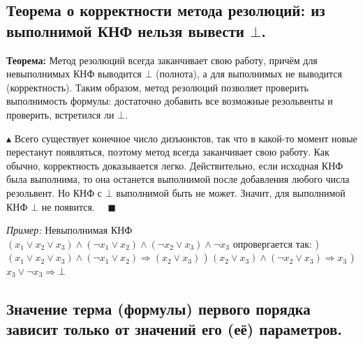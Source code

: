 \subsection{Теорема о корректности метода резолюций: из выполнимой КНФ нельзя вывести $\bot$.}
\textbf{Теорема:} Метод резолюций всегда заканчивает свою работу, причём для невыполнимых КНФ выводится $\bot$ (полнота), а для выполнимых не выводится (корректность). Таким образом, метод резолюций позволяет проверить выполнимость формулы: достаточно добавить все возможные резольвенты и проверить, встретился ли $\bot$.

$\blacktriangle$ Всего существует конечное число дизъюнктов, так что в какой-то момент новые перестанут появляться, поэтому метод всегда заканчивает свою работу. Как обычно, корректность доказывается легко. Действительно, если исходная КНФ была выполнима, то она останется выполнимой после добавления любого числа резольвент. Но КНФ с $\bot$ выполнимой быть не может. Значит, для выполнимой КНФ $\bot$ не появится. $\quad \blacksquare$


\textit{Пример:} Невыполнимая КНФ $(x_1 \lor x_2 \lor x_3) \land (\neg x_1 \lor x_2) \land (\neg x_2 \lor x_3) \land \neg x_3$ опровергается так:
) $(x_1 \lor x_2 \lor x_3) \land (\neg x_1 \lor x_2) \Rightarrow (x_2 \lor x_3)$
) $(x_2 \lor x_3) \land (\neg x_2 \lor x_3) \Rightarrow x_3$
) $x_3 \lor \neg x_3 \Rightarrow \bot$

\subsection{Значение терма (формулы) первого порядка зависит только от значений его (её) параметров.}

